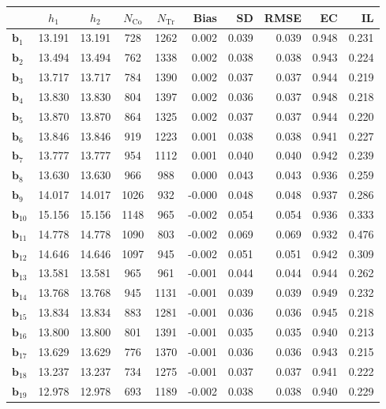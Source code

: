 \documentclass[10pt]{article}
\newcommand{\bb}{\mathbf{b}}
\begin{document}
\begin{table}[p]
    \centering
\begin{tabular}{lccccrrrrr}
\toprule\toprule
 & $h_1$ & $h_2$ & $N_{\mathrm{Co}}$ & $N_{\mathrm{Tr}}$ & Bias & SD & RMSE & EC & IL \\
\midrule
$\bb_{1}$ & 13.191 & 13.191 & 728 & 1262 & 0.002 & 0.039 & 0.039 & 0.948 & 0.231 \\
$\bb_{2}$ & 13.494 & 13.494 & 762 & 1338 & 0.002 & 0.038 & 0.038 & 0.943 & 0.224 \\
$\bb_{3}$ & 13.717 & 13.717 & 784 & 1390 & 0.002 & 0.037 & 0.037 & 0.944 & 0.219 \\
$\bb_{4}$ & 13.830 & 13.830 & 804 & 1397 & 0.002 & 0.036 & 0.037 & 0.948 & 0.218 \\
$\bb_{5}$ & 13.870 & 13.870 & 864 & 1325 & 0.002 & 0.037 & 0.037 & 0.944 & 0.220 \\
$\bb_{6}$ & 13.846 & 13.846 & 919 & 1223 & 0.001 & 0.038 & 0.038 & 0.941 & 0.227 \\
$\bb_{7}$ & 13.777 & 13.777 & 954 & 1112 & 0.001 & 0.040 & 0.040 & 0.942 & 0.239 \\
$\bb_{8}$ & 13.630 & 13.630 & 966 & 988 & 0.000 & 0.043 & 0.043 & 0.936 & 0.259 \\
$\bb_{9}$ & 14.017 & 14.017 & 1026 & 932 & -0.000 & 0.048 & 0.048 & 0.937 & 0.286 \\
$\bb_{10}$ & 15.156 & 15.156 & 1148 & 965 & -0.002 & 0.054 & 0.054 & 0.936 & 0.333 \\
$\bb_{11}$ & 14.778 & 14.778 & 1090 & 803 & -0.002 & 0.069 & 0.069 & 0.932 & 0.476 \\
$\bb_{12}$ & 14.646 & 14.646 & 1097 & 945 & -0.002 & 0.051 & 0.051 & 0.942 & 0.309 \\
$\bb_{13}$ & 13.581 & 13.581 & 965 & 961 & -0.001 & 0.044 & 0.044 & 0.944 & 0.262 \\
$\bb_{14}$ & 13.768 & 13.768 & 945 & 1131 & -0.001 & 0.039 & 0.039 & 0.949 & 0.232 \\
$\bb_{15}$ & 13.834 & 13.834 & 883 & 1281 & -0.001 & 0.036 & 0.036 & 0.945 & 0.218 \\
$\bb_{16}$ & 13.800 & 13.800 & 801 & 1391 & -0.001 & 0.035 & 0.035 & 0.940 & 0.213 \\
$\bb_{17}$ & 13.629 & 13.629 & 776 & 1370 & -0.001 & 0.036 & 0.036 & 0.943 & 0.215 \\
$\bb_{18}$ & 13.237 & 13.237 & 734 & 1275 & -0.001 & 0.037 & 0.037 & 0.941 & 0.222 \\
$\bb_{19}$ & 12.978 & 12.978 & 693 & 1189 & -0.002 & 0.038 & 0.038 & 0.940 & 0.229 \\

\end{tabular}
\end{table}
\end{document}
